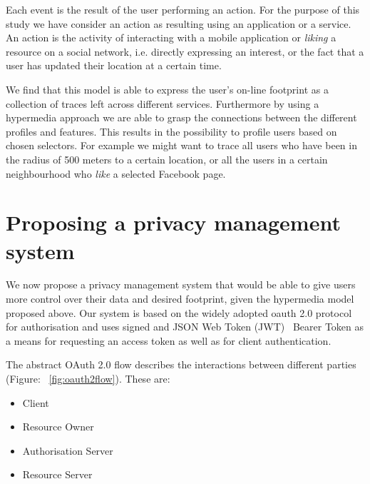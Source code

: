 Each event is the result of the user performing an action. For the purpose of this study we have consider an action as resulting using an application or a service. An action is the activity of interacting with a mobile application or \emph{liking} a resource on a social network, i.e. directly expressing an interest, or the fact that a user has updated their location at a certain time.

We find that this model is able to express the user's on-line footprint as a collection of traces left across different services. Furthermore by using a hypermedia approach we are able to grasp the connections between the different profiles and features. This results in the possibility to profile users based on chosen selectors. For example we might want to trace all users who have been in the radius of 500 meters to a certain location, or all the users in a certain neighbourhood who \emph{like} a selected Facebook page.

\section{Proposing a privacy management system}

We now propose a privacy management system that would be able to give users more control over their data and desired footprint, given the hypermedia model proposed above. Our system is based on the widely adopted oauth 2.0 protocol~\cite{hardt2012oauth} for authorisation and uses signed and JSON Web Token (JWT)~\cite{jones2015json} Bearer Token as a means for requesting an access token as well as for client authentication.

The abstract OAuth 2.0 flow describes the interactions between different parties (Figure: ~\ref{fig:oauth2flow}). These are:

\begin{itemize}
    \item Client
    \item Resource Owner
    \item Authorisation Server
    \item Resource Server
\end{itemize}

